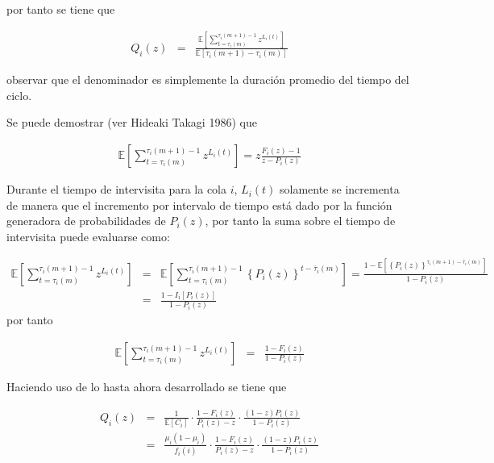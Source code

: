 \documentclass{article}
\newcommand{\esp}{\mathbb{E}}
\begin{document}
por tanto se tiene que


\begin{eqnarray*}
Q_{i}\left(z\right)&=&\frac{\esp\left[\sum_{t=\tau_{i}\left(m\right)}^{\tau_{i}\left(m+1\right)-1}z^{L_{i}\left(t\right)}\right]}{\esp\left[\tau_{i}\left(m+1\right)-\tau_{i}\left(m\right)\right]}
\end{eqnarray*}

observar que el denominador es simplemente la duraci\'on promedio del tiempo del ciclo.


Se puede demostrar (ver Hideaki Takagi 1986) que

\begin{eqnarray*}
\esp\left[\sum_{t=\tau_{i}\left(m\right)}^{\tau_{i}\left(m+1\right)-1}z^{L_{i}\left(t\right)}\right]=z\frac{F_{i}\left(z\right)-1}{z-P_{i}\left(z\right)}
\end{eqnarray*}

Durante el tiempo de intervisita para la cola $i$, $L_{i}\left(t\right)$ solamente se incrementa de manera que el incremento por intervalo de tiempo est\'a dado por la funci\'on generadora de probabilidades de $P_{i}\left(z\right)$, por tanto la suma sobre el tiempo de intervisita puede evaluarse como:

\begin{eqnarray*}
\esp\left[\sum_{t=\tau_{i}\left(m\right)}^{\tau_{i}\left(m+1\right)-1}z^{L_{i}\left(t\right)}\right]&=&\esp\left[\sum_{t=\tau_{i}\left(m\right)}^{\tau_{i}\left(m+1\right)-1}\left\{P_{i}\left(z\right)\right\}^{t-\overline{\tau}_{i}\left(m\right)}\right]=\frac{1-\esp\left[\left\{P_{i}\left(z\right)\right\}^{\tau_{i}\left(m+1\right)-\overline{\tau}_{i}\left(m\right)}\right]}{1-P_{i}\left(z\right)}\\
&=&\frac{1-I_{i}\left[P_{i}\left(z\right)\right]}{1-P_{i}\left(z\right)}
\end{eqnarray*}
por tanto

\begin{eqnarray*}
\esp\left[\sum_{t=\tau_{i}\left(m\right)}^{\tau_{i}\left(m+1\right)-1}z^{L_{i}\left(t\right)}\right]&=&\frac{1-F_{i}\left(z\right)}{1-P_{i}\left(z\right)}
\end{eqnarray*}

Haciendo uso de lo hasta ahora desarrollado se tiene que

\begin{eqnarray*}
Q_{i}\left(z\right)&=&\frac{1}{\esp\left[C_{i}\right]}\cdot\frac{1-F_{i}\left(z\right)}{P_{i}\left(z\right)-z}\cdot\frac{\left(1-z\right)P_{i}\left(z\right)}{1-P_{i}\left(z\right)}\\
&=&\frac{\mu_{i}\left(1-\mu_{i}\right)}{f_{i}\left(i\right)}\cdot\frac{1-F_{i}\left(z\right)}{P_{i}\left(z\right)-z}\cdot\frac{\left(1-z\right)P_{i}\left(z\right)}{1-P_{i}\left(z\right)}
\end{eqnarray*}
\end{document}
